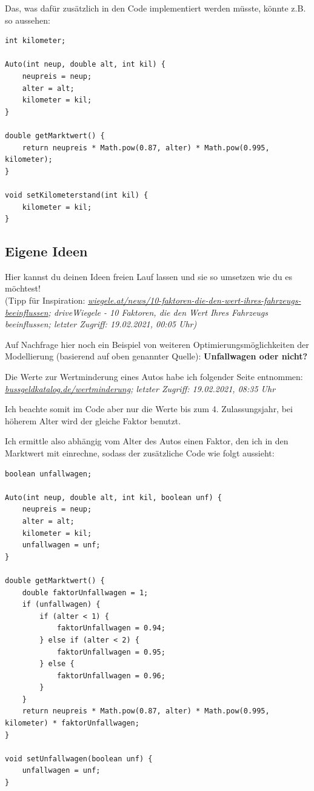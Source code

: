 \documentclass{scrartcl}   %
\begin{document}
Das, was dafür zusätzlich in den Code implementiert werden müsste, könnte z.B. so aussehen:

\begin{lstlisting}
int kilometer;

Auto(int neup, double alt, int kil) {
    neupreis = neup;
    alter = alt;
    kilometer = kil;
}

double getMarktwert() {
    return neupreis * Math.pow(0.87, alter) * Math.pow(0.995, kilometer);
}

void setKilometerstand(int kil) {
    kilometer = kil;
}
\end{lstlisting}

\subsection{Eigene Ideen}

Hier kannst du deinen Ideen freien Lauf lassen und sie so umsetzen wie du es möchtest!\\
(Tipp für Inspiration: \textit{\href{https://www.wiegele.at/news/10-faktoren-die-den-wert-ihres-fahrzeugs-beeinflussen}{wiegele.at/news/10-faktoren-die-den-wert-ihres-fahrzeugs-beeinflussen}; driveWiegele - 10 Faktoren, die den Wert Ihres Fahrzeugs beeinflussen; letzter Zugriff: 19.02.2021, 00:05 Uhr)}

Auf Nachfrage hier noch ein Beispiel von weiteren Optimierungsmöglichkeiten der Modellierung (basierend auf oben genannter Quelle): \textbf{Unfallwagen oder nicht?}

Die Werte zur Wertminderung eines Autos habe ich folgender Seite entnommen:\\ \textit{\href{https://www.bussgeldkatalog.de/wertminderung/}{bussgeldkatalog.de/wertminderung}; letzter Zugriff: 19.02.2021, 08:35 Uhr}

Ich beachte somit im Code aber nur die Werte bis zum 4. Zulassungsjahr, bei höherem Alter wird der gleiche Faktor benutzt.

Ich ermittle also abhängig vom Alter des Autos einen Faktor, den ich in den Marktwert mit einrechne, sodass der zusätzliche Code wie folgt aussieht:\\

\begin{lstlisting}
boolean unfallwagen;

Auto(int neup, double alt, int kil, boolean unf) {
    neupreis = neup;
    alter = alt;
    kilometer = kil;
    unfallwagen = unf;
}

double getMarktwert() {
    double faktorUnfallwagen = 1;
    if (unfallwagen) {
        if (alter < 1) {
            faktorUnfallwagen = 0.94;
        } else if (alter < 2) {
            faktorUnfallwagen = 0.95;
        } else {
            faktorUnfallwagen = 0.96;
        } 
    }
    return neupreis * Math.pow(0.87, alter) * Math.pow(0.995, kilometer) * faktorUnfallwagen;
}

void setUnfallwagen(boolean unf) {
    unfallwagen = unf;
}
\end{lstlisting}
\end{document}
